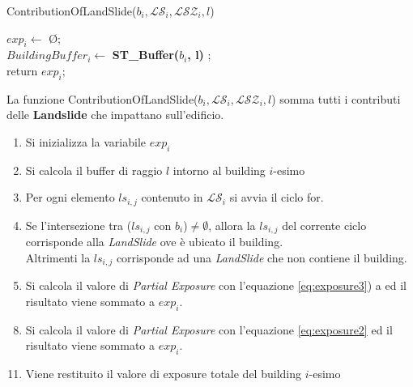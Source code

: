 \begin{algorithm}[H]
	
	\IncMargin{1em}
	\caption{ContributionOfLandSlide($b_i , \mathcal{LS}_i, \mathcal{LSZ}_i, l $) }
	\label{alg:four}
	\BlankLine
	\SetAlgoNoLine
	
	$ exp_i \leftarrow$ \O ;\\
	$ BuildingBuffer_i  \leftarrow $ \textbf{ST\_Buffer($b_i$, l)} ;\\
	return $exp_i;$
\end{algorithm}
La funzione ContributionOfLandSlide($b_i , \mathcal{LS}_i, \mathcal{LSZ}_i, l $) somma tutti i contributi delle \textbf{Landslide} che impattano sull'edificio.
\begin{enumerate}
	\item Si inizializza la variabile $exp_i$ 
	\item Si calcola il buffer di raggio $l$ intorno al building $i$-esimo
	\item Per ogni elemento $ls_{i,j}$ contenuto in $\mathcal{LS}_i $ si avvia il ciclo for.
	\item Se l'intersezione tra ($ls_{i,j}$ con $b_i$)$\not=\emptyset$, allora la $ls_{i,j}$ del corrente ciclo corrisponde alla	\textit{LandSlide} ove è ubicato il building.\\
	Altrimenti la $ls_{i,j}$ corrisponde ad una \textit{LandSlide} che non contiene il building. 
	\item Si calcola il valore di \textit{Partial Exposure} con l'equazione \ref{eq:exposure3}) a ed il risultato viene sommato a $exp_i$.
\end{enumerate}
\begin{enumerate}
	\setcounter{enumi}{7}
	\item Si calcola il valore di \textit{Partial Exposure} con l'equazione \ref{eq:exposure2} ed il risultato viene sommato a $exp_i$. 
\end{enumerate}
\begin{enumerate}
	\setcounter{enumi}{10}
	\item Viene restituito il valore di exposure totale del building $i$-esimo
\end{enumerate}
